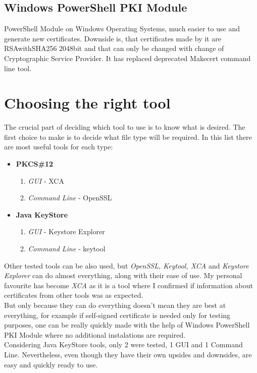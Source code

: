 \documentclass[10pt, a4paper]{report}
\begin{document}
\section{Windows PowerShell PKI Module}
PowerShell Module on Windows Operating Systems, much easier to use and generate new certificates. Downside is, that certificates made by it are RSAwithSHA256 2048bit and that can only be changed with change of Cryptographic Service Provider. It has replaced deprecated Makecert command line tool.

\chapter{Choosing the right tool}
The crucial part of deciding which tool to use is to know what is desired. The first choice to make is to decide what file type will be required.
In this list there are most useful tools for each type:

\begin{itemize}
 \item \textbf{PKCS\#12} \begin{enumerate}\item \textit{GUI} - XCA \item \textit{Command Line} - OpenSSL \end{enumerate}
 \item \textbf{Java KeyStore} \begin{enumerate}\item \textit{GUI} - Keystore Explorer \item \textit{Command Line} - keytool \end{enumerate}
\end{itemize}

Other tested tools can be also used, but \textit{OpenSSL, Keytool, XCA} and \textit{Keystore Explorer} can do almost everything, along with their ease of use. My personal favourite has become \textit{XCA} as it is a tool where I confirmed if information about certificates from other tools was as expected.\\

But only because they can do everything doesn't mean they are best at everything, for example if self-signed certificate is needed only for testing purposes, one can be really quickly made with the help of Windows PowerShell PKI Module where no additional instalations are required.\\

Considering Java KeyStore tools, only 2 were tested, 1 GUI and 1 Command Line. Nevertheless, even though they have their own upsides and downsides, are easy and quickly ready to use.\\
\end{document}
